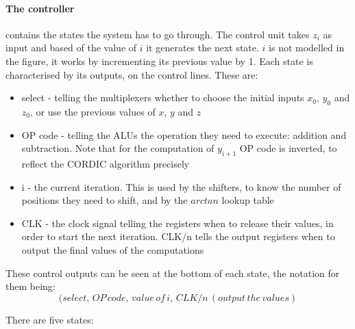 \documentclass[12pt, a4paper,oneside]{article}
\begin{document}
\paragraph{The controller}
contains the states the system has to go through. The control unit takes
$z_i$ as input and based of the value of $i$ it generates the next state.
$i$ is not modelled in the figure, it works by incrementing its previous
value by 1. Each state is characterised by its outputs, on the control
lines. These are:

\begin{itemize}
	\item select - telling the multiplexers whether to choose the initial 
	inputs  $x_0$, $y_0$ and $z_0$, or use the previous values of 
	$x$, $y$ and $z$
	\item OP code - telling the ALUs the operation they need to execute:
	addition and subtraction. Note that for the computation of $y_{i+1}$
	OP code is inverted, to reflect the CORDIC algorithm precisely
	\item i - the current iteration. This is used by the shifters, to 
	know the number of positions they need to shift, and by the $arctan$
	lookup table
	\item CLK - the clock signal telling the registers when to release their
	values, in order to start the next iteration. CLK/n tells the output registers
	when to output the final values of the computations
\end{itemize}

These control outputs can be seen at the bottom of each state, the notation for them being:
\[(select,\, OP\, code,\, value\, of\, i,\, CLK/n\,(output\, the\, values)\]

There are five states:

\newpage
\printbibliography
\end{document}
